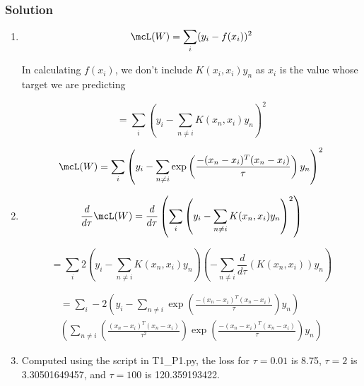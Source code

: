 \documentclass[submit]{harvardml}
\begin{document}
\newpage
\subsubsection*{Solution}

\begin{enumerate}

\item 

\begin{equation*}
\mcL(W) = \sum_{i} (y_i - f(x_i))^2
\end{equation*}

In calculating $f(x_i)$, we don't include $K(x_i, x_i)y_n$ as $x_i$ is the value whose
target we are predicting

\begin{equation*}
= \sum_{i} \left(y_i - \sum_{n\neq i} K(x_n, x_i) y_n \right)^2 
\end{equation*}


\begin{equation*}
\mcL(W) = \sum_{i} \left(y_i - \sum_{n\neq i} \exp\left(\frac{-(x_n-x_i)^T (x_n-x_i)}{\tau} \right) y_n\right)^2 
\end{equation*}

\item 

\begin{equation*}
\frac{d}{d\tau}  \mcL(W)  = 
\frac{d}{d\tau} \left( \sum_{i} \left(y_i - \sum_{n\neq i} K(x_n, x_i) y_n \right)^2 \right)
\end{equation*}

\begin{equation*}
=  \sum_{i}  2 \left(y_i - \sum_{n\neq i} K(x_n, x_i) y_n \right) 
\left(- \sum_{n\neq i}  \frac{d}{d\tau} \left( K(x_n, x_i) \right) y_n \right) 
\end{equation*}


\begin{multline*}
=  
\sum_{i}  - 2 \left(y_i - \sum_{n\neq i} \exp\left(\frac{-(x_n-x_i)^T (x_n-x_i)}{\tau} \right) y_n\right) \\
\left( \sum_{n\neq i} \left(\frac{(x_n-x_i)^T (x_n-x_i)}{\tau^2} \right) \exp\left(\frac{-(x_n-x_i)^T (x_n-x_i)}{\tau} \right)  y_n\right) 
\end{multline*}

\item

Computed using the script in T1\_P1.py, the loss for $\tau=0.01$ is 8.75, $\tau=2$ is 3.30501649457,
and $\tau=100$ is 120.359193422. 


\end{enumerate}
\end{document}
